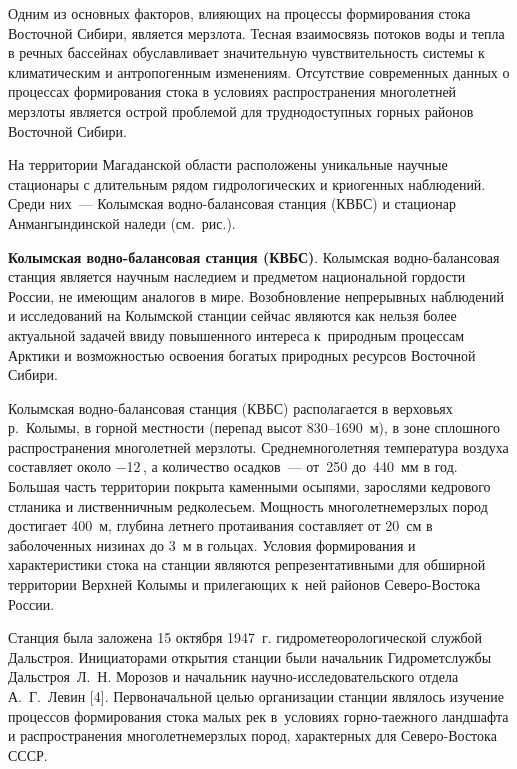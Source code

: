  

\makeProcTitle
{}

Одним из основных факторов, влияющих на процессы формирования стока Восточной Сибири, является мерзлота. Тесная взаимосвязь потоков воды и тепла в речных бассейнах обуславливает значительную чувствительность системы к климатическим и антропогенным изменениям. Отсутствие современных данных о процессах формирования стока в условиях распространения многолетней мерзлоты является острой проблемой для труднодоступных горных районов Восточной Сибири.

На территории Магаданской области расположены уникальные научные стационары с длительным рядом гидрологических и криогенных наблюдений. Среди них~--- Колымская водно-балансовая станция (КВБС) и стационар Анмангындинской наледи (см.~рис.).



\textbf{Колымская водно-балансовая станция (КВБС)}. Колымская водно-балансовая станция является научным наследием и предметом национальной гордости России, не имеющим аналогов в мире. Возобновление непрерывных наблюдений и исследований на Колымской станции сейчас являются как нельзя более актуальной задачей ввиду повышенного интереса к~природным процессам Арктики и возможностью освоения богатых природных ресурсов Восточной Сибири.

Колымская водно-балансовая станция (КВБС) располагается в верховьях р.~Колымы, в горной местности (перепад высот 830--1690~м), в зоне сплошного распространения многолетней мерзлоты. Среднемноголетняя температура воздуха составляет около $-$12\,, а количество осадков~--- от~250 до~440~мм в год. Большая часть территории покрыта каменными осыпями, зарослями кедрового стланика и лиственничным редколесьем. Мощность многолетнемерзлых пород достигает 400~м, глубина летнего протаивания составляет от 20~см в заболоченных низинах до 3~м в гольцах. Условия формирования и характеристики стока на станции являются репрезентативными для обширной территории Верхней Колымы и прилегающих к~ней районов Северо-Востока России.

Станция была заложена 15 октября 1947~г. гидрометеорологической службой Дальстроя. Инициаторами открытия станции были начальник Гидрометслужбы Дальстроя~Л.~Н. Морозов и начальник научно-ис\-сле\-до\-ва\-тель\-ско\-го отдела А.~Г.~Левин [4]. Первоначальной целью организации станции являлось изучение процессов формирования стока малых рек в~условиях горно-таежного ландшафта и распространения многолетнемерзлых пород, характерных для Северо-Востока СССР.

